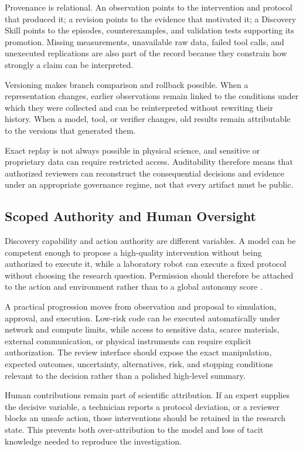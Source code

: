 \documentclass[11pt, a4paper, copyright]{google}
\begin{document}
Provenance is relational. An observation points to the intervention and protocol that produced it; a revision points to the evidence that motivated it; a Discovery Skill points to the episodes, counterexamples, and validation tests supporting its promotion. Missing measurements, unavailable raw data, failed tool calls, and unexecuted replications are also part of the record because they constrain how strongly a claim can be interpreted.

Versioning makes branch comparison and rollback possible. When a representation changes, earlier observations remain linked to the conditions under which they were collected and can be reinterpreted without rewriting their history. When a model, tool, or verifier changes, old results remain attributable to the versions that generated them.

Exact replay is not always possible in physical science, and sensitive or proprietary data can require restricted access. Auditability therefore means that authorized reviewers can reconstruct the consequential decisions and evidence under an appropriate governance regime, not that every artifact must be public.

\subsection{Scoped Authority and Human Oversight}
\label{subsec:human-oversight}

Discovery capability and action authority are different variables. A model can be competent enough to propose a high-quality intervention without being authorized to execute it, while a laboratory robot can execute a fixed protocol without choosing the research question. Permission should therefore be attached to the action and environment rather than to a global autonomy score \citep{scheurer2025humanloop,leong2025safe,tang2025risks}.

A practical progression moves from observation and proposal to simulation, approval, and execution. Low-risk code can be executed automatically under network and compute limits, while access to sensitive data, scarce materials, external communication, or physical instruments can require explicit authorization. The review interface should expose the exact manipulation, expected outcomes, uncertainty, alternatives, risk, and stopping conditions relevant to the decision rather than a polished high-level summary.

Human contributions remain part of scientific attribution. If an expert supplies the decisive variable, a technician reports a protocol deviation, or a reviewer blocks an unsafe action, those interventions should be retained in the research state. This prevents both over-attribution to the model and loss of tacit knowledge needed to reproduce the investigation.
\end{document}
